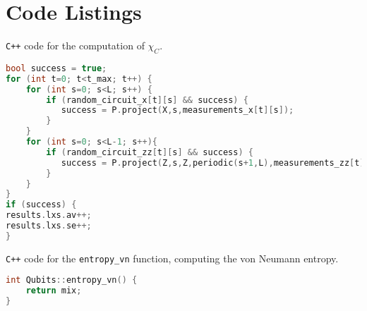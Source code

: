 \chapter{Code Listings}
\label{ch:apdx-code}

\lstset{style=myStyle}

\verb|C++| code for the computation of $\chi_C$.
\begin{lstlisting}[caption=Computation of the linear cross entropy for one
  measurement history of a circuit, label={lst:lxe-cpp}, language=C++]
bool success = true; 
for (int t=0; t<t_max; t++) {
    for (int s=0; s<L; s++) {
        if (random_circuit_x[t][s] && success) {
           success = P.project(X,s,measurements_x[t][s]);
        }
    }
    for (int s=0; s<L-1; s++){
        if (random_circuit_zz[t][s] && success) {
           success = P.project(Z,s,Z,periodic(s+1,L),measurements_zz[t][s]);
        }
    }
}
if (success) {
results.lxs.av++;
results.lxs.se++;
}
\end{lstlisting}

\verb|C++| code for the \verb|entropy_vn| function, computing the von Neumann
entropy.
\begin{lstlisting}[caption=\texttt{entropy\_vn} function in the simulator,
label={lst:entropy-vn-cpp}, language=C++]
int Qubits::entropy_vn() {
    return mix;
}
\end{lstlisting}

